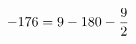 \documentclass[preview]{standalone}
\begin{document}
\begin{align*}
\special{dvisvgm:raw <g id='unique000'>}-176 = 9 - 180 - \frac{9}{2}\special{dvisvgm:raw </g>}
\end{align*}
\end{document}
